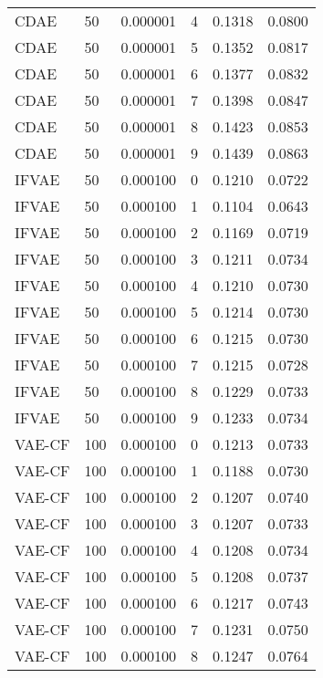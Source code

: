 \begin{tabular}{llrlrr}
    CDAE &   50 &  0.000001 &     4 &  0.1318 &       0.0800 \\
    CDAE &   50 &  0.000001 &     5 &  0.1352 &       0.0817 \\
    CDAE &   50 &  0.000001 &     6 &  0.1377 &       0.0832 \\
    CDAE &   50 &  0.000001 &     7 &  0.1398 &       0.0847 \\
    CDAE &   50 &  0.000001 &     8 &  0.1423 &       0.0853 \\
    CDAE &   50 &  0.000001 &     9 &  0.1439 &       0.0863 \\
   IFVAE &   50 &  0.000100 &     0 &  0.1210 &       0.0722 \\
   IFVAE &   50 &  0.000100 &     1 &  0.1104 &       0.0643 \\
   IFVAE &   50 &  0.000100 &     2 &  0.1169 &       0.0719 \\
   IFVAE &   50 &  0.000100 &     3 &  0.1211 &       0.0734 \\
   IFVAE &   50 &  0.000100 &     4 &  0.1210 &       0.0730 \\
   IFVAE &   50 &  0.000100 &     5 &  0.1214 &       0.0730 \\
   IFVAE &   50 &  0.000100 &     6 &  0.1215 &       0.0730 \\
   IFVAE &   50 &  0.000100 &     7 &  0.1215 &       0.0728 \\
   IFVAE &   50 &  0.000100 &     8 &  0.1229 &       0.0733 \\
   IFVAE &   50 &  0.000100 &     9 &  0.1233 &       0.0734 \\
  VAE-CF &  100 &  0.000100 &     0 &  0.1213 &       0.0733 \\
  VAE-CF &  100 &  0.000100 &     1 &  0.1188 &       0.0730 \\
  VAE-CF &  100 &  0.000100 &     2 &  0.1207 &       0.0740 \\
  VAE-CF &  100 &  0.000100 &     3 &  0.1207 &       0.0733 \\
  VAE-CF &  100 &  0.000100 &     4 &  0.1208 &       0.0734 \\
  VAE-CF &  100 &  0.000100 &     5 &  0.1208 &       0.0737 \\
  VAE-CF &  100 &  0.000100 &     6 &  0.1217 &       0.0743 \\
  VAE-CF &  100 &  0.000100 &     7 &  0.1231 &       0.0750 \\
  VAE-CF &  100 &  0.000100 &     8 &  0.1247 &       0.0764 \\

\end{tabular}
